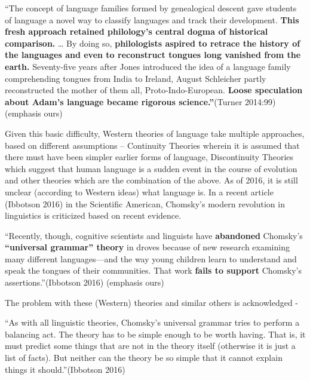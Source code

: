 \begin{myquote}
“The concept of language families formed by genealogical descent gave students of language a novel way to classify languages and track their development. \textbf{This fresh approach retained philology’s central dogma of historical comparison.} … By doing so, \textbf{philologists aspired to retrace the history of the languages and even to reconstruct tongues long vanished from the earth.} Seventy-five years after Jones introduced the idea of a language family comprehending tongues from India to Ireland, August Schleicher partly reconstructed the mother of them all, Proto-Indo-European. \textbf{Loose speculation about Adam’s language became rigorous science.”}\hfill (Turner 2014:99) (emphasis ours)
\end{myquote}

Given this basic difficulty, Western theories of language take multiple approaches, based on different assumptions – Continuity Theories wherein it is assumed that there must have been simpler earlier forms of language, Discontinuity Theories which suggest that human language is a sudden event in the course of evolution and other theories which are the combination of the above. As of 2016, it is still unclear (according to Western ideas) what language is. In a recent article (Ibbotson 2016) in the Scientific American, Chomsky’s modern revolution in linguistics is criticized based on recent evidence.

\begin{myquote}
“Recently, though, cognitive scientists and linguists have \textbf{abandoned } Chomsky’s \textbf{“universal grammar” theory} in droves because of new research examining many different languages—and the way young children learn to understand and speak the tongues of their communities. That work \textbf{fails to support} Chomsky’s assertions.”\hfill (Ibbotson 2016) (emphasis ours)
\end{myquote}

The problem with these (Western) theories and similar others is acknowledged -

\begin{myquote}
“As with all linguistic theories, Chomsky’s universal grammar tries to perform a balancing act. The theory has to be simple enough to be worth having. That is, it must predict some things that are not in the theory itself (otherwise it is just a list of facts). But neither can the theory be so simple that it cannot explain things it should.”\hfill (Ibbotson 2016)
\end{myquote}

